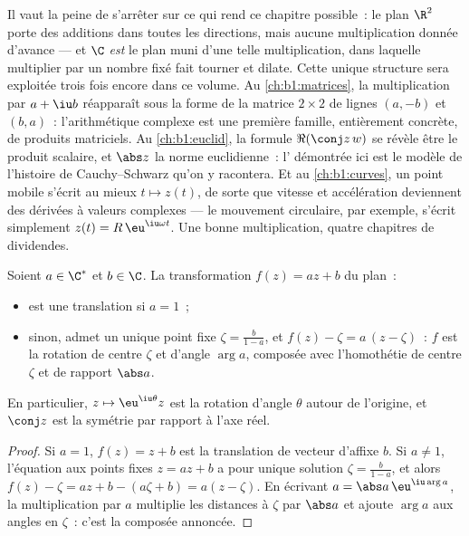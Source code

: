 \begin{remark}\label{rem:b1:complex:interlude}
Il vaut la peine de s'arrêter sur ce qui rend ce chapitre
possible~: le plan $\R^2$ porte des additions dans toutes les
directions, mais aucune multiplication donnée d'avance --- et $\C$
\emph{est} le plan muni d'une telle multiplication, dans laquelle
multiplier par un nombre fixé fait tourner et dilate. Cette unique
structure sera exploitée trois fois encore dans ce volume. Au
\cref{ch:b1:matrices}, la multiplication par $a + \iu b$
réapparaît sous la forme de la matrice $2 \times 2$ de lignes $(a,
-b)$ et $(b, a)$~: l'arithmétique complexe est une première
famille, entièrement concrète, de produits matriciels. Au
\cref{ch:b1:euclid}, la formule $\Re(\conj z\,w)$ se révèle être le
produit scalaire, et $\abs z$ la norme euclidienne~: l' démontrée ici est le modèle de l'histoire de
Cauchy--Schwarz qu'on y racontera. Et au \cref{ch:b1:curves}, un
point mobile s'écrit au mieux $t \mapsto z(t)$, de sorte que
vitesse et accélération deviennent des dérivées à valeurs
complexes --- le mouvement circulaire, par exemple, s'écrit
simplement $z(t) = R\,\eu^{\iu\omega t}$. Une bonne multiplication,
quatre chapitres de dividendes.
\end{remark}

\begin{proposition}\label{prop:b1:complex:similitude}
Soient $a \in \C^*$ et $b \in \C$. La transformation $f(z) = az + b$
du plan~:
\begin{itemize}
  \item est une translation si $a = 1$~;
  \item sinon, admet un unique point fixe $\zeta = \frac{b}{1-a}$,
        et $f(z) - \zeta = a\,(z - \zeta)$~: $f$ est la rotation de
        centre $\zeta$ et d'angle $\arg a$, composée avec
        l'homothétie de centre $\zeta$ et de rapport $\abs a$.
\end{itemize}
En particulier, $z \mapsto \eu^{\iu\theta} z$ est la rotation d'angle
$\theta$ autour de l'origine, et $\conj z$ est la symétrie par rapport
à l'axe réel.
\end{proposition}

\begin{proof}
Si $a = 1$, $f(z) = z + b$ est la translation de vecteur d'affixe $b$.
Si $a \neq 1$, l'équation aux points fixes $z = az + b$ a pour unique
solution $\zeta = \frac{b}{1-a}$, et alors $f(z) - \zeta = az + b -
(a\zeta + b) = a(z - \zeta)$. En écrivant $a = \abs a\, \eu^{\iu\arg
a}$, la multiplication par $a$ multiplie les distances à $\zeta$ par
$\abs a$ et ajoute $\arg a$ aux angles en $\zeta$~: c'est la composée
annoncée.
\end{proof}

